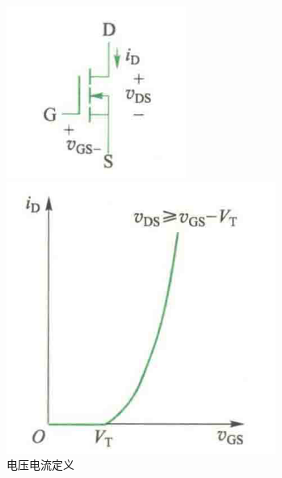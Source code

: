 \documentclass[10pt, a4paper]{article} %
\begin{document}
\begin{figure}[ht]
    \centering
    \begin{minipage}[ht]{0.3\textwidth}
        \centering
        \includegraphics[width=\linewidth]{image/2.png}
        \caption{电压电流定义}
        \label{fig:side:b}
    \end{minipage}
    \hfill
    \begin{minipage}[ht]{0.3\textwidth}
        \centering
        \includegraphics[width=\linewidth]{image/3.png}

\end{minipage}
\end{figure}
\end{document}
